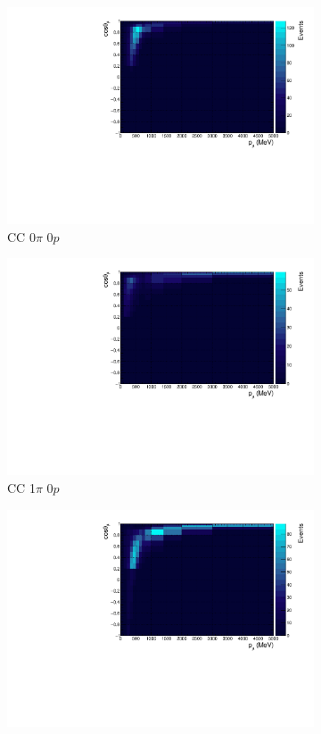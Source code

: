 \begin{figure}
\centering
\begin{subfigure}{.49\textwidth}
  \centering
  \includegraphics[width=0.9\linewidth]{figs/nd280_pmtmuu_cc0pi0p.pdf}
  \caption{CC 0$\pi$ 0$p$}
\end{subfigure}
\begin{subfigure}{.49\textwidth}
  \centering
  \includegraphics[width=0.9\linewidth]{figs/nd280_pmtmuu_cc1pi0p.pdf}
  \caption{CC 1$\pi$ $0p$}
\end{subfigure}
\begin{subfigure}{.49\textwidth}
  \centering
  \includegraphics[width=0.9\linewidth]{figs/nd280_pmtmuu_cc0pi1p.pdf}

\end{subfigure}
\end{figure}
